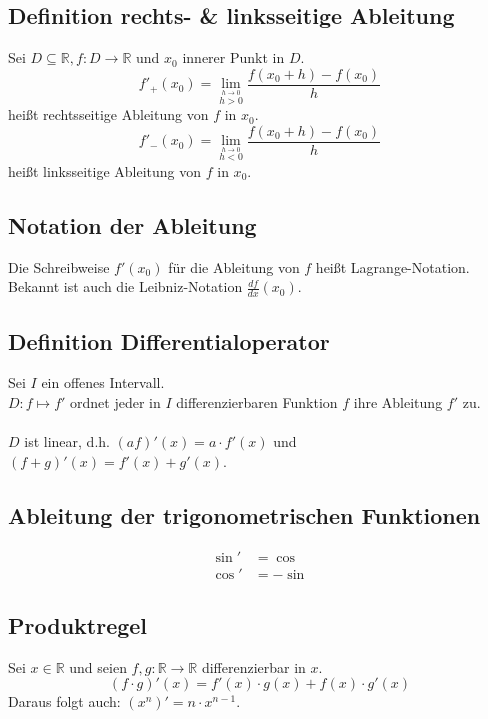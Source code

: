 \documentclass[halfparscip]{scrartcl}
\newcounter{subsection2}
\begin{document}
\subsection{Definition rechts- \& linksseitige Ableitung}
Sei $D \subseteq \mathbb{R}, f: D \rightarrow \mathbb{R}$ und $x_0$ innerer Punkt in $D$.\\
\begin{equation*}
	f'_+(x_0) = \lim_{\stackrel{h\rightarrow 0}{h > 0}}\frac{f(x_0 + h) - f(x_0)}{h}
\end{equation*}
heißt rechtsseitige Ableitung von $f$ in $x_0$.
\begin{equation*}
f'_-(x_0) = \lim_{\stackrel{h\rightarrow 0}{h < 0}}\frac{f(x_0 + h) - f(x_0)}{h}
\end{equation*}
heißt linksseitige Ableitung von $f$ in $x_0$.

\subsection*{Notation der Ableitung}
Die Schreibweise $f'(x_0)$ für die Ableitung von $f$ heißt Lagrange-Notation. Bekannt ist auch die Leibniz-Notation $\frac{df}{dx}(x_0)$.

\subsection*{Definition Differentialoperator}
Sei $I$ ein offenes Intervall.\\
$D: f \mapsto f'$ ordnet jeder in $I$ differenzierbaren Funktion $f$ ihre Ableitung $f'$ zu.\\\\
$D$ ist linear, d.h. $(a f)'(x) = a \cdot f'(x)$ und $(f + g)'(x) = f'(x) + g'(x)$.

\subsection*{Ableitung der trigonometrischen Funktionen}
\begin{align*}
	\sin' &= \cos\\
	\cos' &= -\sin
\end{align*}

\addtocounter{subsection}{4}
\subsection{Produktregel}
Sei $x \in \mathbb{R}$ und seien $f, g: \mathbb{R} \rightarrow \mathbb{R}$ differenzierbar in $x$.\\
\begin{equation*}
	(f \cdot g)'(x) = f'(x)\cdot g(x) + f(x)\cdot g'(x)
\end{equation*}
Daraus folgt auch: $(x^n)' = n \cdot x^{n-1}$.
\end{document}
